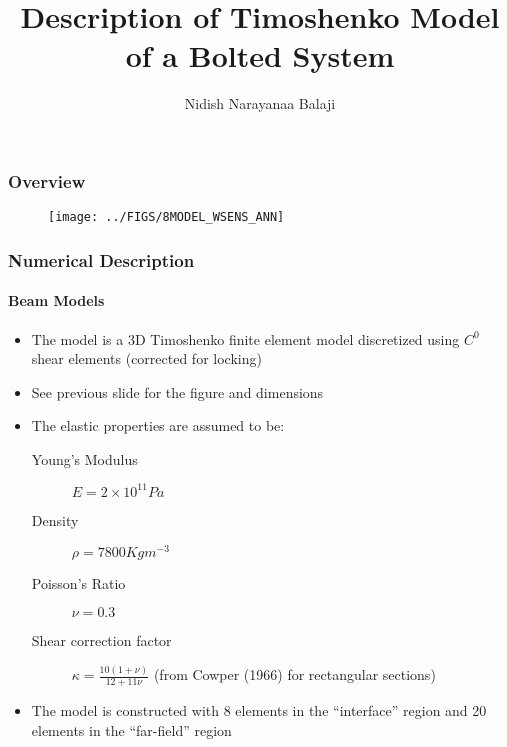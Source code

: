 \documentclass{beamertmd}
\title{Description of Timoshenko Model of a Bolted System}
\author{Nidish Narayanaa Balaji}
\begin{document}
\maketitle{}

\begin{frame}
  \frametitle{Overview}
  \vspace{-0.4cm}
  \begin{figure}[!h]
    \centering
    \texttt{[image: ../FIGS/8MODEL\_WSENS\_ANN]}
  \end{figure}
\end{frame}

\begin{frame}
  \frametitle{Numerical Description}
  \framesubtitle{Beam Models}
  \begin{itemize}
  \item The model is a 3D Timoshenko finite element model discretized
    using $C^0$ shear elements (corrected for locking)
  \item See previous slide for the figure and dimensions
  \item The elastic properties are assumed to be:
    \begin{description}
    \item[Young's Modulus] $E=2\times 10^{11} Pa$
    \item[Density] $\rho = 7800 Kg m^{-3}$      
    \item[Poisson's Ratio] $\nu=0.3$
    \item[Shear correction factor] $\kappa =
      \frac{10(1+\nu)}{12+11\nu}$ (from Cowper (1966) for rectangular
      sections)
    \end{description}
  \item The model is constructed with 8 elements in the ``interface''
    region and 20 elements in the ``far-field'' region
  \end{itemize}
\end{frame}
\end{document}
